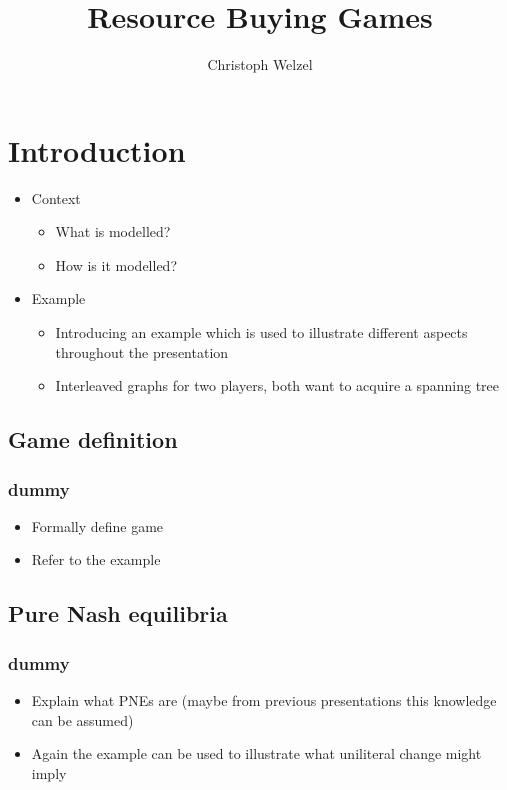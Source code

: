 \documentclass{beamer}
\title{Resource Buying Games}
\author[C. Welzel]{Christoph Welzel}
\newcommand{\ft}{\frametitle{dummy}}
\begin{document}
\maketitle
\section{Introduction}
\begin{frame}
  \begin{itemize}
    \item Context
      \begin{itemize}
        \item What is modelled?
        \item How is it modelled?
      \end{itemize}
    \item Example
      \begin{itemize}
        \item Introducing an example which is used to illustrate different
          aspects throughout the presentation
        \item Interleaved graphs for two players, both want to acquire a
          spanning tree
      \end{itemize}
  \end{itemize}
\end{frame}

\subsection{Game definition}
\begin{frame}
  \ft
  \begin{itemize}
    \item Formally define game
    \item Refer to the example
  \end{itemize}
\end{frame}
\subsection{Pure Nash equilibria}
\begin{frame}
  \ft
  \begin{itemize}
    \item Explain what PNEs are (maybe from previous presentations this
      knowledge can be assumed)
    \item Again the example can be used to illustrate what uniliteral change
      might imply
  \end{itemize}
\end{frame}
\end{document}
